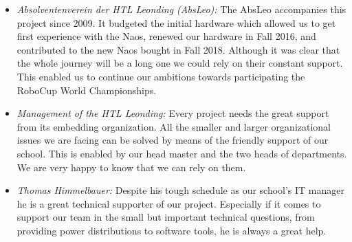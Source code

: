 \documentclass[11pt]{article}
\begin{document}
\begin{itemize}
	\item \emph{Absolventenverein der HTL Leonding (AbsLeo):} The AbsLeo accompanies this project since 2009. It budgeted the initial hardware which allowed us to get first experience with the Naos, renewed our hardware in Fall 2016, and contributed to the new Naos bought in Fall 2018. Although it was clear that the whole journey will be a long one we could rely on their constant support. This enabled us to continue our ambitions towards participating the RoboCup World Championships.
	
	\item \emph{Management of the HTL Leonding:} Every project needs the great support from its embedding organization. All the smaller and larger organizational issues we are facing can be solved by means of the friendly support of our school. This is enabled by our head master and the two heads of departments. We are very happy to know that we can rely on them.
	
	\item \emph{Thomas Himmelbauer:} Despite his tough schedule as our school's IT manager he is a great technical supporter of our project. Especially if it comes to support our team in the small but important technical questions, from providing power distributions to software tools, he is always a great help.
\end{itemize}
\end{document}
